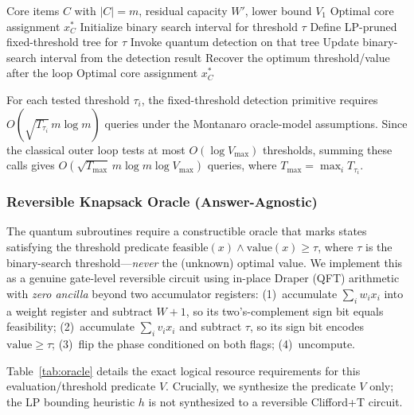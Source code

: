 \documentclass[conference]{IEEEtran}
\begin{document}
\begin{algorithm}[h]
\caption{Classical Threshold-Search Outer Loop (Phase 2)}
\label{alg:qbb}
\begin{algorithmic}[1]
\REQUIRE Core items $C$ with $|C| = m$, residual capacity $W'$, lower bound $V_1$
\ENSURE Optimal core assignment $x^*_C$
\STATE Initialize binary search interval for threshold $\tau$
\STATE Define LP-pruned fixed-threshold tree for $\tau$
\STATE Invoke quantum detection on that tree
\STATE Update binary-search interval from the detection result
\ENDWHILE
\STATE Recover the optimum threshold/value after the loop
\RETURN Optimal core assignment $x^*_C$
\end{algorithmic}
\end{algorithm}

For each tested threshold $\tau_i$, the fixed-threshold detection primitive requires $O(\sqrt{T_{\tau_i}}\,m\log m)$ queries under the Montanaro oracle-model assumptions. Since the classical outer loop tests at most $O(\log V_{\max})$ thresholds, summing these calls gives $O(\sqrt{T_{\max}}\,m\log m\log V_{\max})$ queries, where $T_{\max}=\max_i T_{\tau_i}$.

\subsubsection{Reversible Knapsack Oracle (Answer-Agnostic)}
\label{sec:oracle-impl}

The quantum subroutines require a constructible oracle that marks states satisfying the threshold predicate $\text{feasible}(x) \wedge \text{value}(x) \geq \tau$, where $\tau$ is the binary-search threshold---\textit{never} the (unknown) optimal value. We implement this as a genuine gate-level reversible circuit using in-place Draper (QFT) arithmetic with \textit{zero ancilla} beyond two accumulator registers: (1)~accumulate $\sum_i w_i x_i$ into a weight register and subtract $W{+}1$, so its two's-complement sign bit equals feasibility; (2)~accumulate $\sum_i v_i x_i$ and subtract $\tau$, so its sign bit encodes $\text{value} \geq \tau$; (3)~flip the phase conditioned on both flags; (4)~uncompute. 

Table~\ref{tab:oracle} details the exact logical resource requirements for this evaluation/threshold predicate $V$. Crucially, we synthesize the predicate $V$ only; the LP bounding heuristic $h$ is not synthesized to a reversible Clifford+T circuit. 
\end{document}
